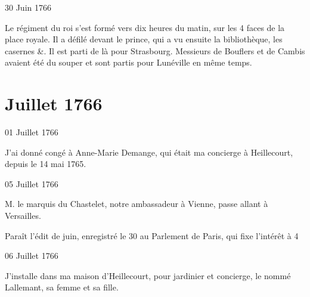                      \begin{diary}{30 Juin 1766}{}


                           Le régiment du roi s'est formé vers dix heures
                           du matin, sur les 4 faces de la
                              place royale.
                           Il a défilé devant le
                              prince, qui a vu ensuite
                           la bibliothèque, les
                              casernes \&. Il est parti de là
                           pour Strasbourg. Messieurs
                           de Bouflers et de Cambis
                           avaient été du souper et sont partis pour
                           Lunéville en même temps. \bigskip


                     \end{diary}
                  \chapter*{Juillet 1766}




                     \begin{diary}{01 Juillet 1766}{}

                         J'ai donné congé à Anne-Marie Demange,
                           qui était ma concierge à Heillecourt, depuis
                           le 14 mai 1765. \bigskip


                     \end{diary}

                     \begin{diary}{05 Juillet 1766}{}


                           M. le marquis du Chastelet,
                           notre ambassadeur
                           à Vienne, passe allant à
                              Versailles. \bigskip


                         Paraît l'édit de juin, enregistré
                           le 30 au Parlement de
                              Paris, qui fixe l'intérêt à 4 %


                     \end{diary}

                     \begin{diary}{06 Juillet 1766}{}

                         J'installe dans ma maison d'Heillecourt, pour
                           jardinier et concierge, le nommé Lallemant, sa
                           femme et sa fille. \bigskip


                     \end{diary}

